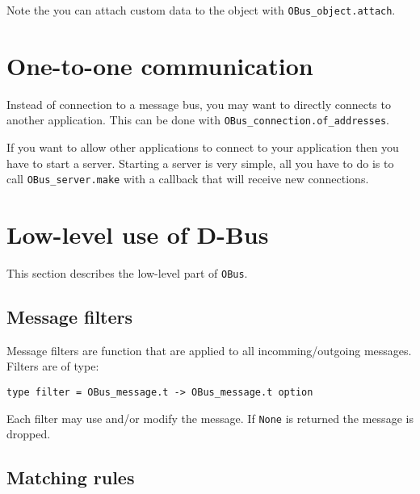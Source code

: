 \documentclass{article}
\newcommand{\obus}{\texttt{OBus}\xspace}
\begin{document}
Note the you can attach custom data to the object with
\texttt{OBus\_object.attach}.

\section{One-to-one communication}

Instead of connection to a message bus, you may want to directly
connects to another application. This can be done with
\texttt{OBus\_connection.of\_addresses}.

If you want to allow other applications to connect to your application
then you have to start a server. Starting a server is very simple, all
you have to do is to call \texttt{OBus\_server.make} with a callback
that will receive new connections.

\section{Low-level use of D-Bus}
\label{lowlevel-section}

This section describes the low-level part of \obus.

\subsection{Message filters}

Message filters are function that are applied to all
incomming/outgoing messages. Filters are of type:

\lstset{language=[Objective]Caml}
\begin{lstlisting}
type filter = OBus_message.t -> OBus_message.t option
\end{lstlisting}

Each filter may use and/or modify the message. If \texttt{None} is
returned the message is dropped.

\subsection{Matching rules}
\end{document}
